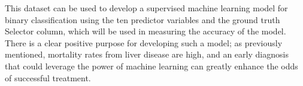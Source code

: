 \documentclass[12pt]{report}
\begin{document}
This dataset can be used to develop a supervised machine learning model for binary classification using the ten predictor 
variables and the ground truth Selector column, which will be used in measuring the accuracy of the model. There is a clear 
positive purpose for developing such a model; as previously mentioned, mortality rates from liver disease are high, and an early
diagnosis that could leverage the power of machine learning can greatly enhance the odds of successful treatment.


\end{document}
